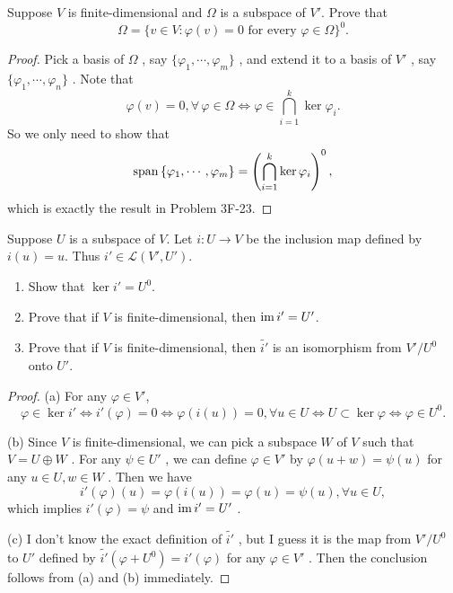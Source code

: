 \documentclass{article}
\begin{document}
\begin{problem}[3F-26]
	Suppose $V$ is finite-dimensional and $\Omega$ is a subspace of $V'$. Prove
	that
	\[
		\Omega = \{v \in V : \varphi(v) = 0 \text{ for every } \varphi \in \Omega\}^0.
	\]
\end{problem}

\begin{proof}
	Pick a basis of \( \Omega \) , say \( \{\varphi_1,\cdots,\varphi_m\} \) , and extend it to a basis of \( V' \) , say \( \{\varphi_1,\cdots,\varphi_n\} \) . Note that
	\[ \varphi(v)=0, \forall\,\varphi\in\Omega\iff\varphi\in\bigcap_{i=1}^{k}\ker\varphi_i. \] 
	So we only need to show that
	\[ \operatorname{span} \left\{\varphi_1,\cdots,\varphi_m\right\}=\left(\bigcap_{i=1}^{k}\ker\varphi_i\right)^0, \] 
	which is exactly the result in Problem 3F-23.
\end{proof}

\begin{problem}[3F-31]
	Suppose $U$ is a subspace of $V$. Let $i : U \to V$ be the inclusion map
	defined by $i(u) = u$. Thus $i' \in \mathcal{L}(V', U')$.
	\begin{enumerate}[label=(\alph*)]
		\item Show that $\ker i' = U^0$.
		\item Prove that if $V$ is finite-dimensional, then
		      $\operatorname{im} i' = U'$.
		\item Prove that if $V$ is finite-dimensional, then $\tilde{i'}$ is an
		      isomorphism from $V'/U^0$ onto $U'$.
	\end{enumerate}
\end{problem}

\begin{proof}
	(a) For any \( \varphi\in V' \), 
	\[ \varphi\in\ker i' \iff i'(\varphi)=0 \iff \varphi(i(u))=0, \forall u\in U \iff U\subset\ker\varphi \iff \varphi\in U^0. \] \par
	(b) Since \( V \) is finite-dimensional, we can pick a subspace \( W \) of \( V \) such that \( V=U\oplus W \) . For any \( \psi\in U' \) , we can define \( \varphi\in V' \) by \( \varphi(u+w)=\psi(u) \) for any \( u\in U,w\in W \) . Then we have
	\[ i'(\varphi)(u)=\varphi(i(u))=\varphi(u)=\psi(u), \forall u\in U, \] which implies \( i'(\varphi)=\psi \) and \( \operatorname{im} i'=U' \) .\par
	(c) I don't know the exact definition of \( \tilde{i'} \) , but I guess it is the map from \( V'/U^0 \) to \( U' \) defined by \( \tilde{i'}(\varphi+U^0)=i'(\varphi) \) for any \( \varphi\in V' \) . Then the conclusion follows from (a) and (b) immediately.
\end{proof}
\end{document}
